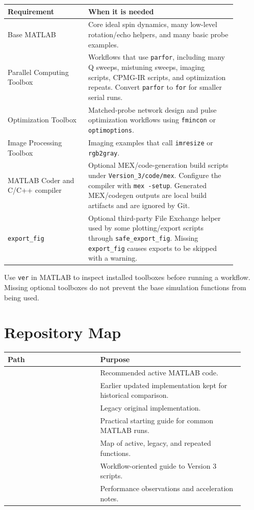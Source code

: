 \documentclass[11pt,oneside]{report}
\newcommand{\code}[1]{\texttt{#1}}
\begin{document}
\begin{longtable}{L{0.31\linewidth}L{0.58\linewidth}}
\toprule
Requirement & When it is needed \\
\midrule
Base MATLAB & Core ideal spin dynamics, many low-level rotation/echo helpers,
and many basic probe examples. \\
Parallel Computing Toolbox & Workflows that use \code{parfor}, including many
Q sweeps, mistuning sweeps, imaging scripts, CPMG-IR scripts, and optimization
repeats. Convert \code{parfor} to \code{for} for smaller serial runs. \\
Optimization Toolbox & Matched-probe network design and pulse optimization
workflows using \code{fmincon} or \code{optimoptions}. \\
Image Processing Toolbox & Imaging examples that call \code{imresize} or
\code{rgb2gray}. \\
MATLAB Coder and C/C++ compiler & Optional MEX/code-generation build scripts
under \code{Version\_3/code/mex}. Configure the compiler
with \code{mex -setup}. Generated MEX/codegen outputs are local build artifacts
and are ignored by Git. \\
\code{export\_fig} & Optional third-party File Exchange helper used by some
plotting/export scripts through \code{safe\_export\_fig}. Missing
\code{export\_fig} causes exports to be skipped with a warning. \\
\bottomrule
\end{longtable}

Use \code{ver} in MATLAB to inspect installed toolboxes before running a
workflow. Missing optional toolboxes do not prevent the base simulation
functions from being used.

\chapter{Repository Map}

\begin{longtable}{L{0.36\linewidth}L{0.56\linewidth}}
\toprule
Path & Purpose \\
\midrule
{} & Recommended active MATLAB code. \\
 & Earlier updated implementation kept for
historical comparison. \\
 & Legacy original implementation. \\
 & Practical starting guide for common MATLAB runs. \\
 & Map of active, legacy, and repeated functions. \\
 & Workflow-oriented guide to Version 3 scripts. \\
 & Performance observations and acceleration notes. \\
\bottomrule
\end{longtable}
\end{document}
